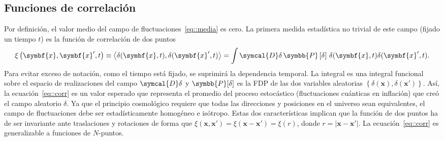 \subsection{Funciones de correlación}
Por definición, el valor medio del campo de fluctuaciones~\eqref{eq::media} es cero. La primera medida estadística no trivial de este campo (fijado un tiempo \(t\)) es la función de correlación de dos puntos
\begin{equation}
    \xi\left(\symbf{x},\symbf{x}',t\right)\equiv\left\langle\delta(\symbf{x},t),\delta(\symbf{x}',t)\right\rangle=\int\symcal{D}\delta\,\symbb{P}\left[\delta\right]\,\delta(\symbf{x},t)\delta(\symbf{x}',t).\label{eq::corr}
\end{equation}
Para evitar exceso de notación, como el tiempo está fijado, se suprimirá la dependencia temporal. La integral es una integral funcional sobre el espacio de realizaciones del campo \(\symcal{D}\delta\) y \(\symbb{P}[\delta]\) es la FDP de las dos variables aleatorias \(\left\lbrace\delta(\symbf{x}),\delta(\symbf{x}')\right\rbrace\). Así, la ecuación~\eqref{eq::corr} es un valor esperado que representa el promedio del proceso estocástico (fluctuaciones cuánticas en inflación) que creó el campo aleatorio \(\delta\). Ya que el principio cosmológico requiere que todas las direcciones y posiciones en el universo sean equivalentes, el campo de fluctuaciones debe ser estadísticamente homogéneo e isótropo. Estas dos características implican que la función de dos puntos ha de ser invariante ante traslaciones y rotaciones de forma que \(\xi(\symbf{x},\symbf{x}')=\xi(\symbf{x}-\symbf{x}')=\xi(r)\), donde \(r=\left|\symbf{x}-\symbf{x}'\right|\). La ecuación~\eqref{eq::corr} es generalizable a funciones de \(N\)-puntos.

